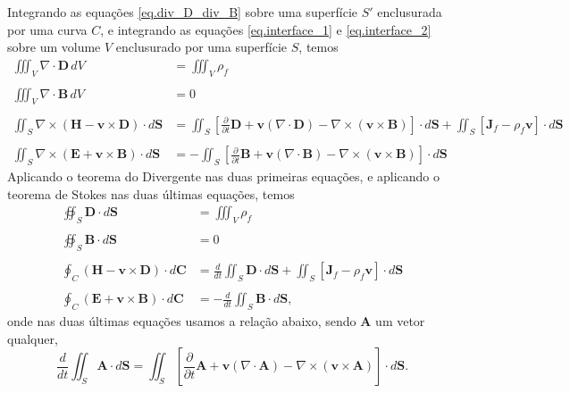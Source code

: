 Integrando as equa\c{c}\~oes \ref{eq.div_D_div_B} sobre uma superf\'icie $S'$ enclusurada por uma curva $C$, e integrando as equa\c{c}\~oes \ref{eq.interface_1} e \ref{eq.interface_2} sobre um volume $V$ enclusurado por uma superf\'icie $S$, temos
\begin{align*}
\iiint_V\nabla\cdot\mathbf{D}\,dV&=\iiint_V\rho_f\\\\
\iiint_V\nabla\cdot\mathbf{B}\,dV&=0\\\\
\iint_S\nabla\times(\mathbf{H}-\mathbf{v}\times\mathbf{D})\cdot d\mathbf{S}&=\iint_S\left[\frac{\partial}{\partial t}\mathbf{D}+\mathbf{v}(\nabla\cdot\mathbf{D})-\nabla\times(\mathbf{v}\times\mathbf{B})\right]\cdot d\mathbf{S}+\iint_S\left[\mathbf{J}_f-\rho_f\mathbf{v}\right]\cdot d\mathbf{S}\\\\
\iint_S\nabla\times(\mathbf{E}+\mathbf{v}\times\mathbf{B})\cdot d\mathbf{S}&=-\iint_S\left[\frac{\partial}{\partial t}\mathbf{B}+\mathbf{v}(\nabla\cdot\mathbf{B})-\nabla\times(\mathbf{v}\times\mathbf{B})\right]\cdot d\mathbf{S}
\end{align*}
Aplicando o teorema do Divergente nas duas primeiras equa\c{c}\~oes, e aplicando o teorema de Stokes nas duas \'ultimas equa\c{c}\~oes, temos
\begin{align}\label{eq.interface_3}
\oiint_S\mathbf{D}\cdot d\mathbf{S}&=\iiint_V\rho_f\\\nonumber\\\label{eq.interface_4}
\oiint_S\mathbf{B}\cdot d\mathbf{S}&=0\\\nonumber\\\label{eq.interface_5}
\oint_C(\mathbf{H}-\mathbf{v}\times\mathbf{D})\cdot d\mathbf{C}&=\frac{d}{dt}\iint_S\mathbf{D}\cdot d\mathbf{S}+\iint_S\left[\mathbf{J}_f-\rho_f\mathbf{v}\right]\cdot d\mathbf{S}\\\nonumber\\\label{eq.interface_6}
\oint_C(\mathbf{E}+\mathbf{v}\times\mathbf{B})\cdot d\mathbf{C}&=-\frac{d}{dt}\iint_S\mathbf{B}\cdot d\mathbf{S},
\end{align} 
onde nas duas \'ultimas equa\c{c}\~oes usamos a rela\c{c}\~ao abaixo, sendo $\mathbf{A}$ um vetor qualquer,
\begin{equation*}
\frac{d}{dt}\iint_S\mathbf{A}\cdot d\mathbf{S}=\iint_S\left[\frac{\partial}{\partial t}\mathbf{A}+\mathbf{v}(\nabla\cdot\mathbf{A})-\nabla\times(\mathbf{v}\times\mathbf{A})\right]\cdot d\mathbf{S}.
\end{equation*}
